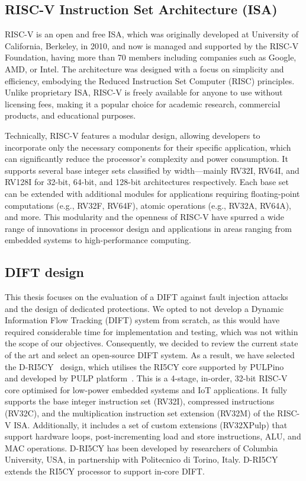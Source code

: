 \subsection{RISC-V Instruction Set Architecture (ISA)}
RISC-V is an open and free ISA, which was originally developed at University of California, Berkeley, in 2010, and now is managed and supported by the RISC-V Foundation, having more than 70 members including companies such as Google, AMD, or Intel. The architecture was designed with a focus on simplicity and efficiency, embodying the Reduced Instruction Set Computer (RISC) principles. Unlike proprietary ISA, RISC-V is freely available for anyone to use without licensing fees, making it a popular choice for academic research, commercial products, and educational purposes.

Technically, RISC-V features a modular design, allowing developers to incorporate only the necessary components for their specific application, which can significantly reduce the processor's complexity and power consumption. It supports several base integer sets classified by width—mainly RV32I, RV64I, and RV128I for 32-bit, 64-bit, and 128-bit architectures respectively. Each base set can be extended with additional modules for applications requiring floating-point computations (e.g., RV32F, RV64F), atomic operations (e.g., RV32A, RV64A), and more. This modularity and the openness of RISC-V have spurred a wide range of innovations in processor design and applications in areas ranging from embedded systems to high-performance computing.

\subsection{DIFT design}
This thesis focuses on the evaluation of a DIFT against fault injection attacks and the design of dedicated protections. We opted to not develop a Dynamic Information Flow Tracking (DIFT) system from scratch, as this would have required considerable time for implementation and testing, which was not within the scope of our objectives. Consequently, we decided to review the current state of the art and select an open-source DIFT system.
As a result, we have selected the D-RI5CY~\cite{PDGLC-18-hpec, driscy} design, which utilises the RI5CY core supported by PULPino~\cite{pulpino} and developed by PULP platform~\cite{pulp}. This is a 4-stage, in-order, 32-bit RISC-V core optimised for low-power embedded systems and IoT applications. It fully supports the base integer instruction set (RV32I), compressed instructions (RV32C), and the multiplication instruction set extension (RV32M) of the RISC-V ISA. Additionally, it includes a set of custom extensions (RV32XPulp) that support hardware loops, post-incrementing load and store instructions, ALU, and MAC operations.
D-RI5CY has been developed by researchers of Columbia University, USA, in partnership with Politecnico di Torino, Italy. D-RI5CY extends the RI5CY processor to support in-core DIFT.

